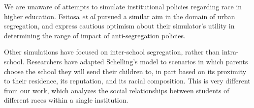 We are unaware of attempts to simulate institutional policies regarding race
in higher education. Feitosa \textit{et al}
\citeyear{feitosa_multi-agent_2011} pursued a similar aim in the domain of
urban segregation, and express cautious optimism about their simulator's
utility in determining the range of impact of anti-segregation policies.

Other simulations have focused on inter-school segregation, rather than
intra-school. Researchers \cite[for instance]{stoica_schelling_2014,millington_aspiration_2014} have adapted
Schelling's model to scenarios in which parents choose the school they will
send their children to, in part based on its proximity to their residence, its
reputation, and its racial composition. This is very different from our work,
which analyzes the social relationships between students of different races
within a single institution.

